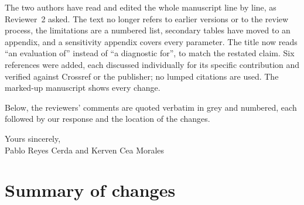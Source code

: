 \documentclass[11pt,a4paper]{article}
\begin{document}
The two authors have read and edited the whole manuscript line by line, as Reviewer~2 asked. The text no longer refers to earlier versions or to the review process, the limitations are a numbered list, secondary tables have moved to an appendix, and a sensitivity appendix covers every parameter. The title now reads ``an evaluation of'' instead of ``a diagnostic for'', to match the restated claim. Six references were added, each discussed individually for its specific contribution and verified against Crossref or the publisher; no lumped citations are used. The marked-up manuscript shows every change.

Below, the reviewers' comments are quoted verbatim in grey and numbered, each followed by our response and the location of the changes.

\bigskip
Yours sincerely,\\
Pablo Reyes Cerda and Kerven Cea Morales

\newpage
\section*{Summary of changes}
\end{document}
